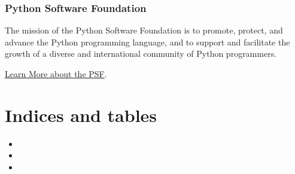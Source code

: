 \documentclass[letterpaper,10pt,english]{sphinxmanual}
\begin{document}
\subsection{Python Software Foundation}
\label{\detokenize{support/error:python-software-foundation}}
The mission of the Python Software Foundation is to promote, protect, and
advance the Python programming language, and to support and facilitate the
growth of a diverse and international community of Python programmers.

\href{http://www.python.org/psf/}{Learn More about the PSF}.


\chapter{Indices and tables}
\label{\detokenize{index:indices-and-tables}}\begin{itemize}
\item {} 

\item {} 

\item {} 

\end{itemize}



\renewcommand{\indexname}{Index}
\printindex
\end{document}

